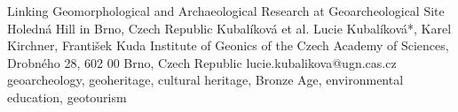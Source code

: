 \abstract
{Linking Geomorphological and Archaeological Research at Geoarcheological Site Holedná Hill in Brno, Czech Republic} 
{Kubalíková et al.} 
{Lucie Kubalíková*, Karel Kirchner, František Kuda} 
{\KLtag} 
{Institute of Geonics of the Czech Academy of Sciences, Drobného 28, 602 00 Brno, Czech Republic
}
{lucie.kubalikova@ugn.cas.cz}  %
{geoarcheology, geoheritage, cultural heritage, Bronze Age, environmental education, geotourism}

